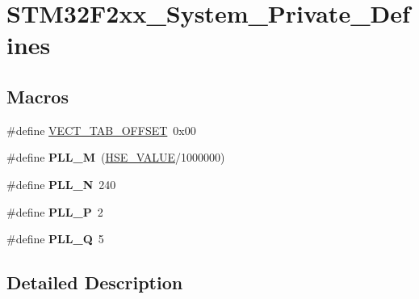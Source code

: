 \hypertarget{group___s_t_m32_f2xx___system___private___defines}{\section{S\-T\-M32\-F2xx\-\_\-\-System\-\_\-\-Private\-\_\-\-Defines}
\label{group___s_t_m32_f2xx___system___private___defines}
}
\subsection*{Macros}
\begin{DoxyCompactItemize}
\item 
\#define \hyperlink{group___s_t_m32_f2xx___system___private___defines_ga40e1495541cbb4acbe3f1819bd87a9fe}{V\-E\-C\-T\-\_\-\-T\-A\-B\-\_\-\-O\-F\-F\-S\-E\-T}~0x00
\item 
\hypertarget{group___s_t_m32_f2xx___system___private___defines_ga0fa5a868f5cd056a04b1c42e454b9617}{\#define {\bfseries P\-L\-L\-\_\-\-M}~(\hyperlink{group___library__configuration__section_gaeafcff4f57440c60e64812dddd13e7cb}{H\-S\-E\-\_\-\-V\-A\-L\-U\-E}/1000000)}\label{group___s_t_m32_f2xx___system___private___defines_ga0fa5a868f5cd056a04b1c42e454b9617}

\item 
\hypertarget{group___s_t_m32_f2xx___system___private___defines_ga04586ea638d21afe558db4f2798c38a6}{\#define {\bfseries P\-L\-L\-\_\-\-N}~240}\label{group___s_t_m32_f2xx___system___private___defines_ga04586ea638d21afe558db4f2798c38a6}

\item 
\hypertarget{group___s_t_m32_f2xx___system___private___defines_ga290dcd27167e925d817e8334111c1c01}{\#define {\bfseries P\-L\-L\-\_\-\-P}~2}\label{group___s_t_m32_f2xx___system___private___defines_ga290dcd27167e925d817e8334111c1c01}

\item 
\hypertarget{group___s_t_m32_f2xx___system___private___defines_gac958257ddb2537c539cffdb3a4543067}{\#define {\bfseries P\-L\-L\-\_\-\-Q}~5}\label{group___s_t_m32_f2xx___system___private___defines_gac958257ddb2537c539cffdb3a4543067}

\end{DoxyCompactItemize}


\subsection{Detailed Description}


